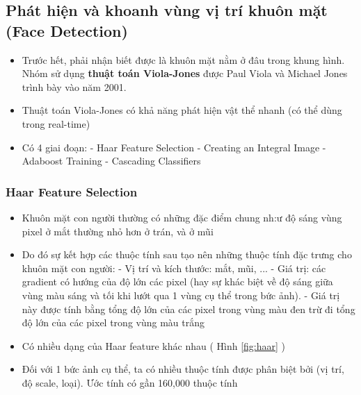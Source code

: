\documentclass[a4paper]{article}
\begin{document}
\subsection{Phát hiện và khoanh vùng vị trí khuôn mặt (Face Detection)}
\begin{itemize}
    \item Trước hết, phải nhận biết được là khuôn mặt nằm ở đâu trong khung hình. Nhóm sử dụng \textbf{thuật toán Viola-Jones} được Paul Viola và Michael Jones trình bày vào năm 2001. 
    \item Thuật toán Viola-Jones có khả năng phát hiện vật thể nhanh (có thể dùng trong real-time)
    \item Có 4 giai đoạn:
    \subitem - Haar Feature Selection
    \subitem - Creating an Integral Image
    \subitem - Adaboost Training
    \subitem - Cascading Classifiers
\end{itemize}
\subsubsection{Haar Feature Selection}
\begin{itemize}
    \item Khuôn mặt con người thường có những đặc điểm chung nh:ư độ sáng vùng pixel ở mắt thường nhỏ hơn ở trán, và ở mũi
    \item Do đó sự kết hợp các thuộc tính sau tạo nên những thuộc tính đặc trưng cho khuôn mặt con người:
    \subitem - Vị trí và kích thước: mắt, mũi, ... 
    \subitem - Giá trị: các gradient có hướng của độ lớn các pixel (hay sự khác biệt về độ sáng giữa vùng màu sáng và tối khi lướt qua 1 vùng cụ thể trong bức ảnh).
    \subitem - Giá trị này được tính bằng tổng độ lớn của các pixel trong vùng màu đen trừ đi tổng độ lớn của các pixel trong vùng màu trắng
    \item Có nhiều dạng của Haar feature khác nhau ( Hình \ref{fig:haar} )
    \item Đối với 1 bức ảnh cụ thể, ta có nhiều thuộc tính được phân biệt bởi (vị trí, độ scale, loại). Ước tính có gần 160,000 thuộc tính
    
    
\end{itemize}
\end{document}
